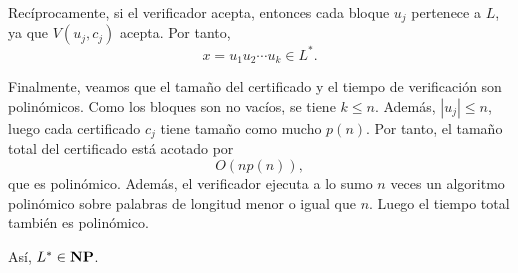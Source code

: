 \begin{ejercicio}
    Recíprocamente, si el verificador acepta, entonces cada bloque $u_j$ pertenece a
    $L$, ya que $V(u_j,c_j)$ acepta. Por tanto,
    $$x = u_1u_2\cdots u_k \in L^*.$$

    Finalmente, veamos que el tamaño del certificado y el tiempo de verificación son
    polinómicos. Como los bloques son no vacíos, se tiene $k \leq n$. Además,
    $|u_j| \leq n$, luego cada certificado $c_j$ tiene tamaño como mucho $p(n)$.
    Por tanto, el tamaño total del certificado está acotado por
    $$O(np(n)),$$
    que es polinómico. Además, el verificador ejecuta a lo sumo $n$ veces un algoritmo
    polinómico sobre palabras de longitud menor o igual que $n$. Luego el tiempo total
    también es polinómico.

    Así, $L^* \in \textbf{NP}$.
\end{ejercicio}



